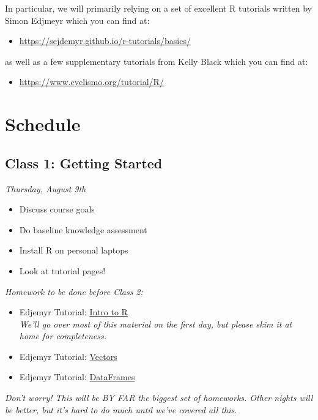 \documentclass[12pt]{article}
\begin{document}
In particular, we will primarily relying on a set of excellent R tutorials written by Simon Edjmeyr which you can find at:
\begin{itemize}
    \item \href{https://sejdemyr.github.io/r-tutorials/basics/}{https://sejdemyr.github.io/r-tutorials/basics/}
\end{itemize}
as well as a few supplementary tutorials from Kelly Black which you can find at:
\begin{itemize}
    \item \href{https://www.cyclismo.org/tutorial/R/}{https://www.cyclismo.org/tutorial/R/}
\end{itemize}


\section{Schedule}


\subsection*{Class 1: Getting Started}
\emph{Thursday, August 9th}
\begin{itemize}
    \item Discuss course goals
    \item Do baseline knowledge assessment
    \item Install R on personal laptops
    \item Look at tutorial pages!
\end{itemize}

\emph{Homework to be done before Class 2:}
\begin{itemize}
    \item Edjemyr Tutorial: \href{https://sejdemyr.github.io/r-tutorials/basics/introduction/}{Intro to R} \\
    \emph{We'll go over most of this material on the first day, but please skim it at home for completeness.}
    \item Edjemyr Tutorial: \href{https://sejdemyr.github.io/r-tutorials/basics/vectors/}{Vectors}
    \item Edjemyr Tutorial: \href{https://sejdemyr.github.io/r-tutorials/basics/dataset-basics/}{DataFrames}
\end{itemize}

\emph{Don't worry! This will be BY FAR the biggest set of homeworks. Other nights will be better, but it's hard to do much until we've covered all this.}
\end{document}
